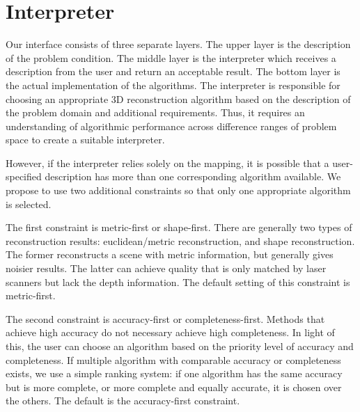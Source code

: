 

\section{Interpreter}
\label{sec:interp}
Our interface consists of three separate layers. The upper layer is the description of the problem condition. The middle layer is the interpreter which receives a description from the user and return an acceptable result. The bottom layer is the actual implementation of the algorithms. The interpreter is responsible for choosing an appropriate 3D reconstruction algorithm based on the description of the problem domain and additional requirements. Thus, it requires an understanding of algorithmic performance across difference ranges of problem space to create a suitable interpreter.

However, if the interpreter relies solely on the mapping, it is possible that a user-specified description has more than one corresponding algorithm available. We propose to use two additional constraints so that only one appropriate algorithm is selected.

The first constraint is metric-first or shape-first. There are generally two types of reconstruction results: euclidean/metric reconstruction, and shape reconstruction. The former reconstructs a scene with metric information, but generally gives noisier results. The latter can achieve quality that is only matched by laser scanners but lack the depth information. The default setting of this constraint is metric-first.

The second constraint is accuracy-first or completeness-first. Methods that achieve high accuracy do not necessary achieve high completeness. In light of this, the user can choose an algorithm based on the priority level of accuracy and completeness. If multiple algorithm with comparable accuracy or completeness exists, we use a simple ranking system: if one algorithm has the same accuracy but is more complete, or more complete and equally accurate, it is chosen over the others. The default is the accuracy-first constraint.

